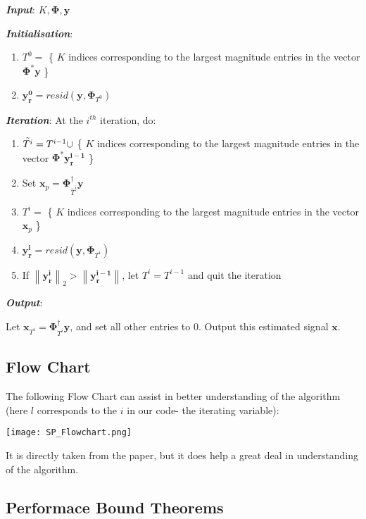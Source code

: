\documentclass[fleqn, 11pt]{article}
\newcommand{\bs}[1]{\boldsymbol{#1}}
\newcommand\norm[1]{\left\lVert#1\right\rVert}
\begin{document}
\medskip

\textbf{\textit{Input}}: $K, \bs{\Phi}, \bs{y}$

\medskip

\textbf{\textit{Initialisation}}:
\begin{enumerate}
    \item $T^0 = $ \{ $K$ indices corresponding to the largest magnitude entries in the vector $\bs{\Phi^*y}$ \} 
    \item $\bs{y^0_r}  = resid ( \bs{y}, \bs{\Phi}_{T^0} ) $
\end{enumerate}

\textbf{\textit{Iteration}}:
At the $i^{th}$ iteration, do:

\begin{enumerate}
    \item $\Tilde{T^i} = T^{i-1} \cup $ \{ $K$ indices corresponding to the largest magnitude entries in the vector $\bs{\Phi^*y^{i-1}_r}$ \}
    \item Set $\bs{x}_p = \bs{\Phi}^{\dagger}_{\hat{T}^i} \bs{y} $
    \item $T^i = $ \{ $K$ indices corresponding to the largest magnitude entries in the vector $\bs{x}_p$ \} 
    \item $\bs{y^i_r}  = resid ( \bs{y}, \bs{\Phi}_{T^i} ) $
    \item If $\norm{\bs{y^i_r}  }_2 > \norm{\bs{y^{i-1}_r}}  $,  let ${T^i}= {T^{i-1}}$ and quit the iteration
\end{enumerate}

\textbf{\textit{Output}}:

Let $\bs{x}_{T^i} = \bs{\Phi}^{\dagger}_{T^i}\bs{y}  $, and set all other entries to 0. Output this estimated signal $\bs{x}$.

\hrulefill

\subsection*{Flow Chart}

The following Flow Chart can assist in better understanding of the algorithm (here $l$ corresponds to the $i$ in our code- the iterating variable): 

\texttt{[image: SP\_Flowchart.png]}

It is directly taken from the paper, but it does help a great deal in  understanding of the algorithm.

\newpage

\subsection*{Performace Bound Theorems }
\end{document}
